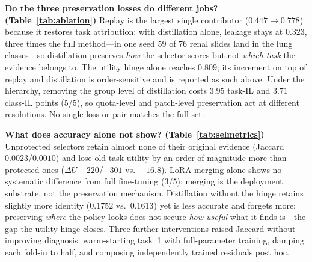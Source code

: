 \documentclass{article}
\begin{document}
\textbf{Do the three preservation losses do different jobs? (Table~\ref{tab:ablation})}
Replay is the largest single contributor ($0.447\rightarrow0.778$) because it restores task attribution: with distillation alone, leakage stays at $0.323$, three times the full method---in one seed 59 of 76 renal slides land in the lung classes---so distillation preserves \emph{how} the selector scores but not \emph{which task} the evidence belongs to. The utility hinge alone reaches $0.809$; its increment on top of replay and distillation is order-sensitive and is reported as such above. Under the hierarchy, removing the group level of distillation costs $3.95$ task-IL and $3.71$ class-IL points (5/5), so quota-level and patch-level preservation act at different resolutions. No single loss or pair matches the full set.

\begin{table}[t]
\centering\footnotesize
\caption{\textbf{Selection-level metrics under the ablation protocol} (flat, fold 1, mean over 5 seeds): what accuracy alone cannot show.}
\label{tab:selmetrics}
\end{table}

\textbf{What does accuracy alone not show? (Table~\ref{tab:selmetrics})}
Unprotected selectors retain almost none of their original evidence (Jaccard $0.0023$/$0.0010$) and lose old-task utility by an order of magnitude more than protected ones ($\Delta U$ $-220$/$-301$ vs.\ $-16.8$). LoRA merging alone shows no systematic difference from full fine-tuning (3/5): merging is the deployment substrate, not the preservation mechanism. Distillation without the hinge retains slightly more identity ($0.1752$ vs.\ $0.1613$) yet is less accurate and forgets more: preserving \emph{where} the policy looks does not secure \emph{how useful} what it finds is---the gap the utility hinge closes. Three further interventions raised Jaccard without improving diagnosis: warm-starting task~1 with full-parameter training, damping each fold-in to half, and composing independently trained residuals post hoc.
\end{document}
